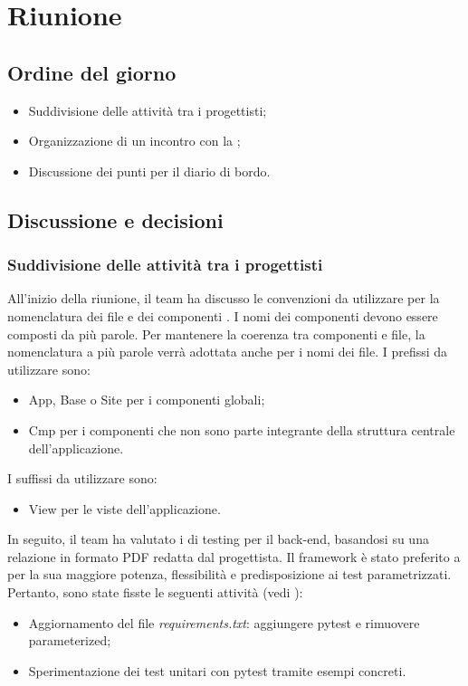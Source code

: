 \section{Riunione}
\subsection{Ordine del giorno}
\begin{itemize}
	\item Suddivisione delle attività tra i progettisti;
	\item Organizzazione di un incontro con la ;
	\item Discussione dei punti per il diario di bordo.
\end{itemize}

\subsection{Discussione e decisioni}
\subsubsection{Suddivisione delle attività tra i progettisti}
\par All'inizio della riunione, il team ha discusso le convenzioni da utilizzare per la nomenclatura dei file e dei componenti . I nomi dei componenti devono essere composti da più parole. Per mantenere la coerenza tra componenti e file, la nomenclatura a più parole verrà adottata anche per i nomi dei file. I prefissi da utilizzare sono:
\begin{itemize}
	\item App, Base o Site per i componenti globali;
	\item Cmp per i componenti che non sono parte integrante della struttura centrale dell'applicazione.
\end{itemize}

\vspace{0.5\baselineskip}
\par I suffissi da utilizzare sono:
\begin{itemize}
	\item View per le viste dell'applicazione.
\end{itemize}

\vspace{0.5\baselineskip}
\par In seguito, il team ha valutato i  di testing per il back-end, basandosi su una relazione in formato PDF redatta dal progettista. Il framework  è stato preferito a  per la sua maggiore potenza, flessibilità e predisposizione ai test parametrizzati. Pertanto, sono state fisste le seguenti attività (vedi ):
\begin{itemize}
	\item Aggiornamento del file \textit{requirements.txt}: aggiungere pytest e rimuovere parameterized;
	\item Sperimentazione dei test unitari con pytest tramite esempi concreti.
\end{itemize}

